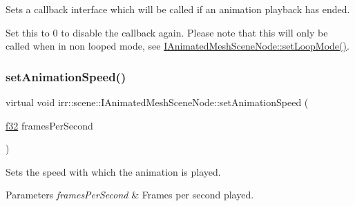 Sets a callback interface which will be called if an animation playback has ended. 

Set this to 0 to disable the callback again. Please note that this will only be called when in non looped mode, see \hyperlink{classirr_1_1scene_1_1IAnimatedMeshSceneNode_ae6cae051c74c3953061aa9e49e10cd06}{I\+Animated\+Mesh\+Scene\+Node\+::set\+Loop\+Mode()}. \mbox{\label{classirr_1_1scene_1_1IAnimatedMeshSceneNode_a89ef2d20c6e9e83fdb861403c9698c4a}} 
\subsubsection{\texorpdfstring{set\+Animation\+Speed()}{setAnimationSpeed()}\hspace{0.1cm}{\footnotesize\ttfamily [1/2]}}
{\footnotesize\ttfamily virtual void irr\+::scene\+::\+I\+Animated\+Mesh\+Scene\+Node\+::set\+Animation\+Speed (\begin{DoxyParamCaption}\item[{\hyperlink{namespaceirr_a0277be98d67dc26ff93b1a6a1d086b07}{f32}}]{frames\+Per\+Second }\end{DoxyParamCaption})\hspace{0.3cm}{\ttfamily [pure virtual]}}



Sets the speed with which the animation is played. 


\begin{DoxyParams}{Parameters}
{\em frames\+Per\+Second} & Frames per second played. \\
\hline
\end{DoxyParams}
\mbox{\label{classirr_1_1scene_1_1IAnimatedMeshSceneNode_a89ef2d20c6e9e83fdb861403c9698c4a}} 
